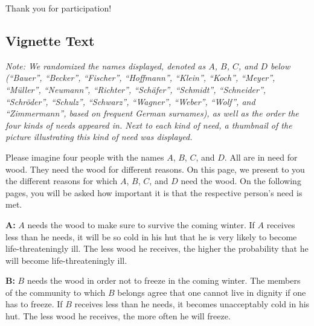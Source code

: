 \documentclass[egregdoesnotlikesansseriftitles]{scrartcl}
\begin{document}
Thank you for participation! %


\subsection*{Vignette Text}
\noindent\textit{Note: We randomized the names displayed, denoted as $A$, $B$, $C$, and $D$ below (``Bauer'', ``Becker'', ``Fischer'', ``Hoffmann'', ``Klein'', ``Koch'', ``Meyer'', ``Müller'', ``Neumann'', ``Richter'', ``Schäfer'', ``Schmidt'', ``Schneider'', ``Schröder'', ``Schulz'', ``Schwarz'', ``Wagner'', ``Weber'', ``Wolf'', and ``Zimmermann'', based on frequent German surnames), as well as the order the four kinds of needs appeared in.
Next to each kind of need, a thumbnail of the picture illustrating this kind of need was displayed.}\vspace{2ex}

\noindent Please imagine four people with the names $A$, $B$, $C$, and $D$. %
All are in need for wood. %
They need the wood for different reasons. %
On this page, we present to you the different reasons for which $A$, $B$, $C$, and $D$ need the wood. %
On the following pages, you will be asked how important it is that the respective person's need is met.\vspace{2ex} %

\noindent\textbf{A:} $A$ needs the wood to make sure to survive the coming winter. %
If $A$ receives less than he needs, it will be so cold in his hut that he is very likely to become life-threateningly ill. %
The less wood he receives, the higher the probability that he will become life-threateningly ill.\vspace{2ex} %

\noindent\textbf{B:} $B$ needs the wood in order not to freeze in the coming winter. %
The members of the community to which $B$ belongs agree that one cannot live in dignity if one has to freeze. %
If $B$ receives less than he needs, it becomes unacceptably cold in his hut. %
The less wood he receives, the more often he will freeze.\vspace{2ex} %
\end{document}
